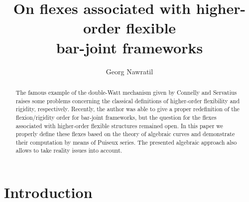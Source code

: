 \documentclass{svproc}
\begin{document}
\mainmatter              %
%
\title{
On flexes associated with higher-order flexible \\ bar-joint frameworks}
%
%
\author{Georg Nawratil}
%
%
%

\maketitle              

\begin{abstract}
The famous example of the double-Watt mechanism given by Connelly and Servatius raises some problems concerning the classical definitions of higher-order flexibility and rigidity, respectively. 
Recently, the author was able to give a proper redefinition of the flexion/rigidity order  
for bar-joint frameworks, but the question for the flexes associated with higher-order flexible structures remained open. In this paper we properly define these flexes based on the theory of algebraic curves and demonstrate their computation by means of Puiseux series. The presented algebraic approach also allows to take reality issues into account.
\end{abstract}










\section{Introduction}
\label{sec:introduction}
\end{document}
